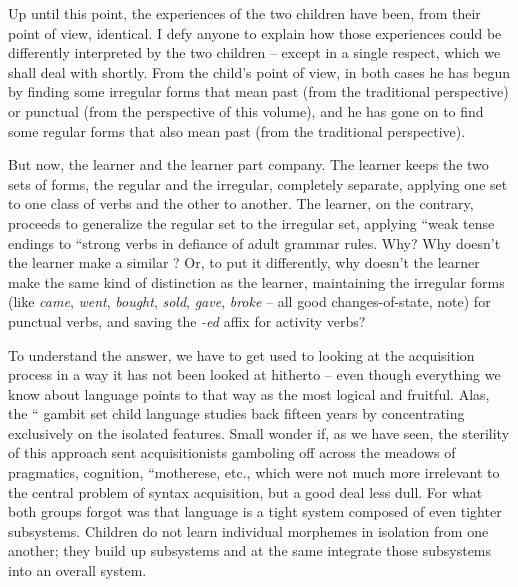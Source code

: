 Up until this point, the experiences of the two children have been, from their point of view, identical. I defy anyone to explain how those experiences could be differently interpreted by the two children -- except in a single respect, which we shall deal with shortly. From the child's point of view, in both cases he has begun by finding some irregular forms that mean past (from the traditional perspective) or punctual (from the perspective of this volume), and he has gone on to find some regular forms that also mean past (from the traditional perspective).

But now, the  learner and the  learner part company. The  learner keeps the two sets of forms, the regular and the irregular, completely separate, applying one set to one class of verbs and the other to another. The  learner, on the contrary, proceeds to generalize the regular set to the irregular set, applying ``weak tense endings to ``strong verbs in defiance of adult grammar rules. Why? Why doesn't the  learner make a similar ? Or, to put it differently, why doesn't the  learner make the same kind of distinction as the  learner, maintaining the irregular forms (like \textit{came}, \textit{went}, \textit{bought}, \textit{sold}, \textit{gave}, \textit{broke} -- all good changes-of-state, note) for punctual verbs, and saving the \textit{-ed} affix for activity verbs?

To understand the answer, we have to get used to looking at the
acquisition process in a way it has not been looked at hitherto -- even though everything we know about language points to that way as the most logical and fruitful. Alas, the `` gambit set child language studies back fifteen years by concentrating exclusively on the  isolated features. Small wonder if, as we have seen, the sterility of this approach sent acquisitionists gamboling off across the meadows of pragmatics, cognition, ``motherese, etc., which were not much more irrelevant to the central problem of syntax acquisition, but a good deal less dull. For what both groups forgot was that language is a tight system composed of even tighter subsystems. Children do not learn individual morphemes in isolation from one another; they build up subsystems and at the same  integrate those subsystems into an overall system.

